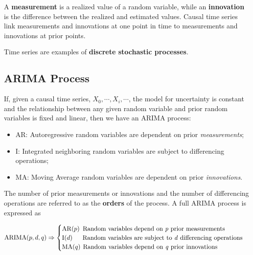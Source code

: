 \documentclass[12pt, twoside, draft]{article}
\begin{document}
A \textbf{measurement} is a realized value of a random variable, while an \textbf{innovation} is the difference between the realized and estimated values.  Causal time series link measurements and innovations at one point in time to measurements and innovations at prior points.

Time series are examples of \textbf{discrete stochastic processes}.

\subsection{ARIMA Process}\label{sec:ARIMA_process}
If, given a causal time series, $X_0, \cdots, X_i, \cdots$, the model for uncertainty is constant and the relationship between any given random variable and prior random variables is fixed and linear, then we have an ARIMA process:

\begin{itemize}[noitemsep]
\item AR: \hspace{2pt} Autoregressive \hspace{11pt} random variables are dependent on prior \textit{measurements};
\item I: \hspace{14pt} Integrated \hspace{28pt} neighboring random variables are subject to differencing operations;
\item MA: \hspace{1pt} Moving Average \hspace{3pt} random variables are dependent on prior \textit{innovations}.
\end{itemize}

The number of prior measurements or innovations and the number of differencing operations are referred to as the \textbf{orders} of the process.  A full ARIMA process is expressed as

\begin{equation}
\operatorname{ARIMA}(p, d, q) \Rightarrow
\begin{cases}
\operatorname{AR}(p) \hspace{5pt} \text{Random variables depend on \textit{p} prior measurements} \\
\operatorname{I}(d) \hspace{16pt} \text{Random variables are subject to \textit{d} differencing operations} \\
\operatorname{MA}(q) \hspace{4pt} \text{Random variables depend on \textit{q} prior innovations}
\end{cases}
\end{equation}
\end{document}
